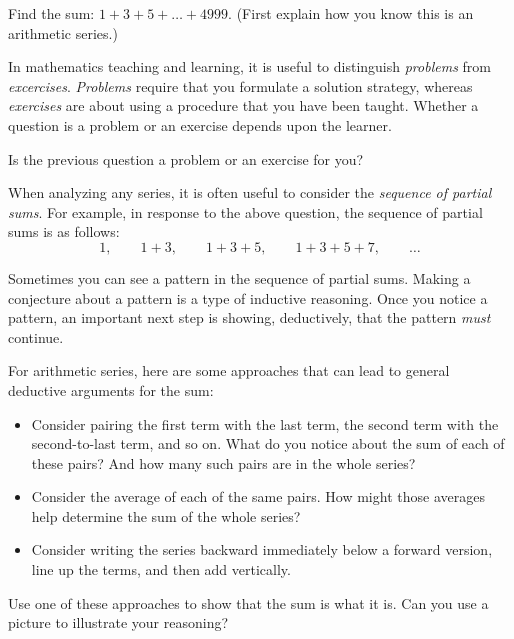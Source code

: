 \begin{question}
Find the sum:  $1 + 3 + 5 + \dots + 4999.$  (First explain how you know this is an arithmetic series.)
\end{question}
\QM

In mathematics teaching and learning, it is useful to distinguish \emph{problems} from  \emph{excercises}. \emph{Problems} require that you formulate a solution strategy, whereas \emph{exercises} are about using a procedure that you have been taught.  Whether a question is a problem or an exercise depends upon the learner.  
\begin{question}
Is the previous question a problem or an exercise for you?  
\end{question}

When analyzing any series, it is often useful to consider the \emph{sequence of partial sums}.  For example, in response to the above question, the sequence of partial sums is as follows:  $$1, \qquad 1 + 3, \qquad 1+ 3+5, \qquad 1+3+5+7, \qquad \dots$$

Sometimes you can see a pattern in the sequence of partial sums.  Making a conjecture about a pattern is a type of inductive reasoning.  Once you notice a pattern, an important next step is showing, deductively, that the pattern \emph{must} continue.  

For arithmetic series, here are some approaches that can lead to general deductive arguments for the sum: 

\begin{itemize}
\item Consider pairing the first term with the last term, the second term with the second-to-last term, and so on.  What do you notice about the sum of each of these pairs?  And how many such pairs are in the whole series?  
\item Consider the average of each of the same pairs.  How might those averages help determine the sum of the whole series?  
\item Consider writing the series backward immediately below a forward version, line up the terms, and then add vertically.  
\end{itemize}

\begin{question}
Use one of these approaches to show that the sum is what it is.  Can you use a picture to illustrate your reasoning?    
\end{question}
\QM

